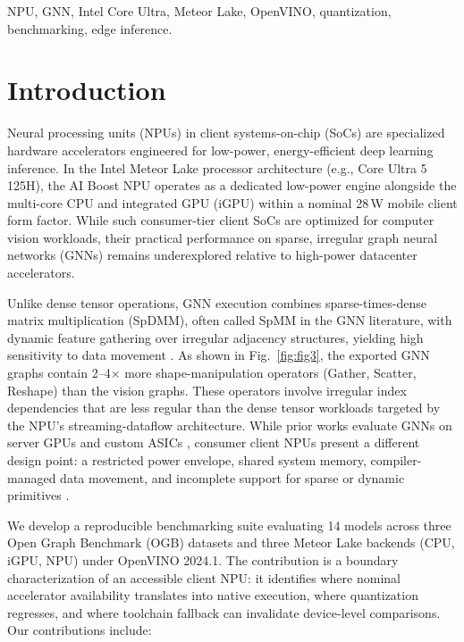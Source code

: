 \documentclass[conference]{IEEEtran}
\begin{document}
\begin{IEEEkeywords}
NPU, GNN, Intel Core Ultra, Meteor Lake, OpenVINO, quantization, benchmarking, edge inference.
\end{IEEEkeywords}

\section{Introduction}

Neural processing units (NPUs) in client systems-on-chip (SoCs) are specialized hardware accelerators engineered for low-power, energy-efficient deep learning inference. In the Intel Meteor Lake processor architecture (e.g., Core Ultra 5 125H), the AI Boost NPU operates as a dedicated low-power engine alongside the multi-core CPU and integrated GPU (iGPU) within a nominal 28\,W mobile client form factor. While such consumer-tier client SoCs are optimized for computer vision workloads, their practical performance on sparse, irregular graph neural networks (GNNs) remains underexplored relative to high-power datacenter accelerators.

Unlike dense tensor operations, GNN execution combines sparse-times-dense matrix multiplication (SpDMM), often called SpMM in the GNN literature, with dynamic feature gathering over irregular adjacency structures, yielding high sensitivity to data movement \cite{9161360, 9218751}. As shown in Fig.~\ref{fig:fig3}, the exported GNN graphs contain 2--4$\times$ more shape-manipulation operators (Gather, Scatter, Reshape) than the vision graphs. These operators involve irregular index dependencies that are less regular than the dense tensor workloads targeted by the NPU's streaming-dataflow architecture. While prior works evaluate GNNs on server GPUs and custom ASICs \cite{9065592, 9858684, 10411398}, consumer client NPUs present a different design point: a restricted power envelope, shared system memory, compiler-managed data movement, and incomplete support for sparse or dynamic primitives \cite{intel_meteorlake_hotchips_2022, intel_core_ultra_npu}.

We develop a reproducible benchmarking suite evaluating 14 models across three Open Graph Benchmark (OGB) datasets and three Meteor Lake backends (CPU, iGPU, NPU) under OpenVINO 2024.1. The contribution is a boundary characterization of an accessible client NPU: it identifies where nominal accelerator availability translates into native execution, where quantization regresses, and where toolchain fallback can invalidate device-level comparisons. Our contributions include:
\end{document}
